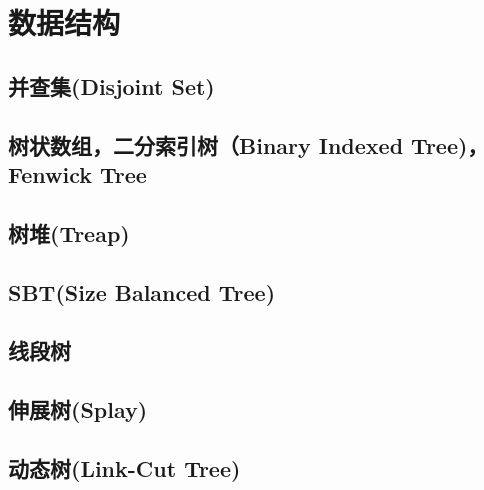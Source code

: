 \section{数据结构}
\subsection{并查集(Disjoint Set)}
\subsection{树状数组，二分索引树（Binary Indexed Tree)，Fenwick Tree}
\subsection{树堆(Treap)}
\subsection{SBT(Size Balanced Tree)}
\subsection{线段树}
\subsection{伸展树(Splay)}
\subsection{动态树(Link-Cut Tree)}
